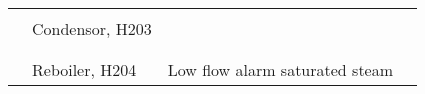 \begin{table}[p]
\begin{tabularx}{\linewidth}{@{}lp{2cm}XX@{}}
     &                           &                                                                                                                                                               &                                                                                                                                                                                                                                                         \\ \cmidrule(l){2-4} 
     & Condensor, H203           &                                                                                                                                                               &                                                                                                                                                                                                                                                         \\ \cmidrule(l){3-4} 
     &                           &                                                                                                                                                               &                                                                                                                                                                                                                                                         \\ \cmidrule(l){3-4} 
     &                           &                                                                                                                                                               &                                                                                                                                                                                                                                                         \\ \cmidrule(l){2-4} 
     & Reboiler, H204            & Low flow alarm saturated steam                                                                                                                                &                                                                                                                                                                                                                                                         \\ \bottomrule
\end{tabularx}%
\end{table}
